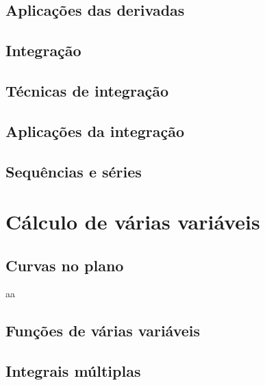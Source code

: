 \documentclass[12pt]{book}
\begin{document}
\chapter{Aplicações das derivadas}

\chapter{Integração}

\chapter{Técnicas de integração}

\chapter{Aplicações da integração}

\chapter{Sequências e séries} 


\part{Cálculo de várias variáveis}

\chapter{Curvas no plano}
aa

\chapter{Funções de várias variáveis}

\chapter{Integrais múltiplas}


\end{document}
